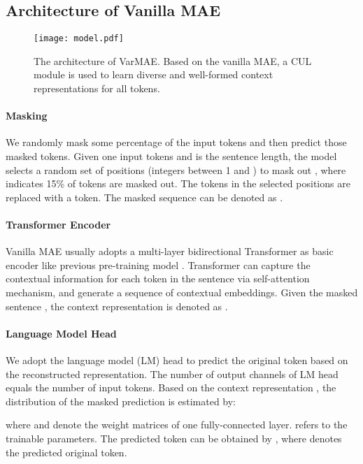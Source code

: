 \documentclass[11pt]{article}
\begin{document}
\subsection{Architecture of Vanilla MAE}

\begin{figure}[t]
    \centering
    \texttt{[image: model.pdf]} 
    \caption{The architecture of VarMAE. Based on the vanilla MAE, a CUL module is used to learn diverse and well-formed context representations for all tokens. }
    \label{fig:model}
\end{figure}
\paragraph{Masking}

We randomly mask some percentage of the input tokens and then predict those masked tokens.
Given one input tokens  and  is the sentence length, the model selects a random set of positions (integers between 1 and ) to mask out , where  indicates 15\% of tokens are masked out.
The tokens in the selected positions are replaced with a  token. 
The masked sequence can be denoted as .

\paragraph{Transformer Encoder}
{Vanilla MAE usually} adopts a multi-layer bidirectional Transformer \cite{DBLP:conf/nips/VaswaniSPUJGKP17} as basic encoder like previous pre-training model  \cite{DBLP:journals/corr/abs-1907-11692}.
Transformer can capture the contextual information for each token in the sentence via self-attention mechanism, and generate a sequence of contextual embeddings. Given the masked sentence , the context representation is denoted as .



\paragraph{Language Model Head}
We adopt the language model (LM) head to predict the original token based on the reconstructed representation. The number of output channels of LM head equals the number of input tokens. 
Based on the context representation , the distribution of the masked prediction is estimated by:
   
where  and  denote the weight matrices of one fully-connected layer.  refers to the trainable parameters.
The predicted token can be obtained by , where  denotes the predicted original token.
\end{document}
